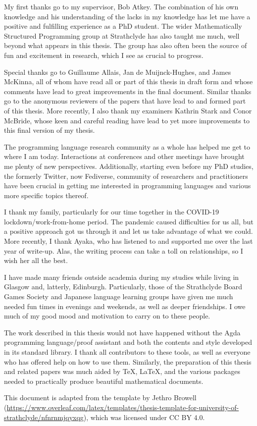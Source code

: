 My first thanks go to my supervisor, Bob Atkey.
The combination of his own knowledge and his understanding of the lacks in my
knowledge has let me have a positive and fulfilling experience as a PhD student.
The wider Mathematically Structured Programming group at Strathclyde has also
taught me much, well beyond what appears in this thesis.
The group has also often been the source of fun and excitement in research,
which I see as crucial to progress.

Special thanks go to Guillaume Allais, Jan de Muijnck-Hughes, and James McKinna,
all of whom have read all or part of this thesis in draft form and whose
comments have lead to great improvements in the final document.
Similar thanks go to the anonymous reviewers of the papers that have lead to and
formed part of this thesis.
More recently, I also thank my examiners Kathrin Stark and Conor McBride,
whose keen and careful reading have lead to yet more improvements to this final
version of my thesis.

The programming language research community as a whole has helped me get to
where I am today.
Interactions at conferences and other meetings have brought me plenty of new
perspectives.
Additionally, starting even before my PhD studies, the formerly Twitter, now
Fediverse, community of researchers and practitioners have been crucial in
getting me interested in programming languages and various more specific topics
thereof.

I thank my family, particularly for our time together in the COVID-19
lockdown/work-from-home period.
The pandemic caused difficulties for us all, but a positive approach got us
through it and let us take advantage of what we could.
More recently, I thank Ayaka, who has listened to and supported me over the last
year of write-up.
Alas, the writing process can take a toll on relationships, so I wish her all
the best.

I have made many friends outside academia during my studies while living in
Glasgow and, latterly, Edinburgh.
Particularly, those of the Strathclyde Board Games Society and Japanese language
learning groups have given me much needed fun times in evenings and weekends, as
well as deeper friendships.
I owe much of my good mood and motivation to carry on to these people.

The work described in this thesis would not have happened without the Agda
programming language/proof assistant and both the contents and style developed
in its standard library.
I thank all contributors to these tools, as well as everyone who has offered
help on how to use them.
Similarly, the preparation of this thesis and related papers was much aided by
\TeX, \LaTeX, and the various packages needed to practically produce beautiful
mathematical documents.

This document is adapted from the template by Jethro Browell
(\url{https://www.overleaf.com/latex/templates/thesis-template-for-university-of-strathclyde/nfnrnmjqyxqg}),
which was licensed under CC BY 4.0.
